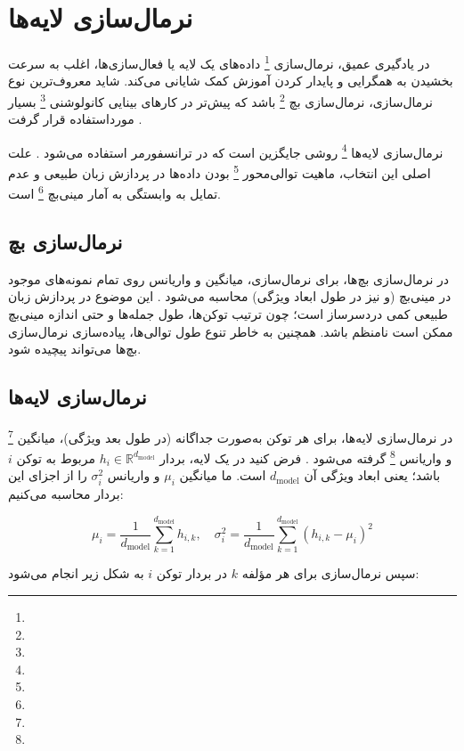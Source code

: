 \section{نرمال‌سازی لایه‌ها}

در یادگیری عمیق، نرمال‌سازی \footnote{} داده‌های یک لایه یا فعال‌سازی‌ها، اغلب به سرعت بخشیدن به همگرایی و پایدار کردن آموزش کمک شایانی می‌کند. شاید معروف‌ترین نوع نرمال‌سازی، نرمال‌سازی بچ \footnote{} باشد که پیش‌تر در کارهای بینایی کانولوشنی \footnote{} بسیار مورداستفاده قرار گرفت \cite{ioffe2015batch}.

نرمال‌سازی لایه‌ها \footnote{} روشی جایگزین است که در ترانسفورمر استفاده می‌شود \cite{ba2016layer,vaswani2017attention}. علت اصلی این انتخاب، ماهیت توالی‌محور \footnote{} بودن داده‌ها در پردازش زبان طبیعی و عدم تمایل به وابستگی به آمار مینی‌بچ \footnote{} است.

\subsection*{نرمال‌سازی بچ}
در نرمال‌سازی بچ‌ها، برای نرمال‌سازی، میانگین و واریانس روی تمام نمونه‌های موجود در مینی‌بچ (و نیز در طول ابعاد ویژگی) محاسبه می‌شود \cite{ioffe2015batch}.
این موضوع در پردازش زبان طبیعی کمی دردسرساز است؛ چون ترتیب توکن‌ها، طول جمله‌ها و حتی اندازه مینی‌بچ ممکن است نامنظم باشد.
همچنین به خاطر تنوع طول توالی‌ها، پیاده‌سازی نرمال‌سازی بچ‌ها می‌تواند پیچیده شود.

\subsection*{نرمال‌سازی لایه‌ها}
در نرمال‌سازی لایه‌ها، برای هر توکن به‌صورت جداگانه (در طول بعد ویژگی)، میانگین \footnote{} و واریانس \footnote{} گرفته می‌شود \cite{ba2016layer}.
فرض کنید در یک لایه، بردار \( h_i \in \mathbb{R}^{d_{\text{model}}} \) مربوط به توکن \( i \) باشد؛ یعنی ابعاد ویژگی آن \( d_{\text{model}} \) است. ما میانگین \( \mu_i \) و واریانس \( \sigma_i^2 \) را از اجزای این بردار محاسبه می‌کنیم:

\begin{equation}
	\mu_i = \frac{1}{d_{\text{model}}} \sum_{k=1}^{d_{\text{model}}} h_{i,k}, \quad
	\sigma_i^2 = \frac{1}{d_{\text{model}}} \sum_{k=1}^{d_{\text{model}}} (h_{i,k} - \mu_i)^2
	\label{eq:mean_variance}
\end{equation}

سپس نرمال‌سازی برای هر مؤلفه \( k \) در بردار توکن \( i \) به شکل زیر انجام می‌شود:

